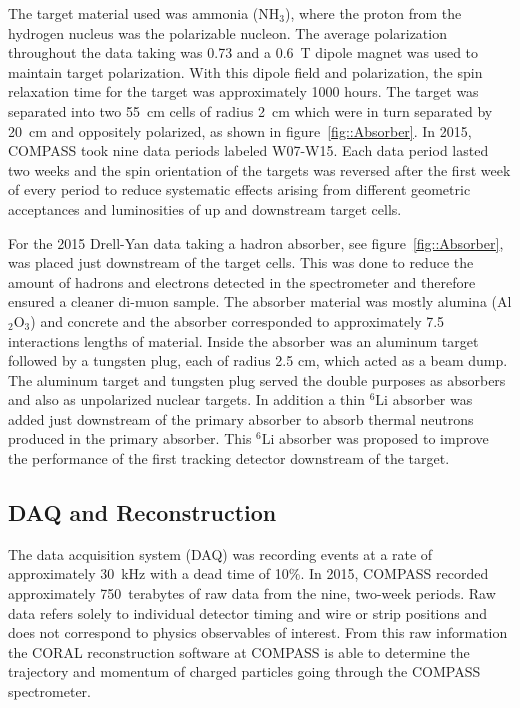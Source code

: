 The target material used was ammonia ($\mathrm{NH}_3$), where the proton from
the hydrogen nucleus was the polarizable nucleon.  The average polarization
throughout the data taking was 0.73 and a 0.6~T dipole magnet was used to
maintain target polarization.  With this dipole field and polarization, the spin
relaxation time for the target was approximately 1000 hours.  The target was
separated into two 55~cm cells of radius 2~cm which were in turn separated by
20~cm and oppositely polarized, as shown in figure~\ref{fig::Absorber}.  In 2015,
COMPASS took nine data periods labeled W07-W15.  Each data period lasted two
weeks and the spin orientation of the targets was reversed after the first week
of every period to reduce systematic effects arising from different geometric
acceptances and luminosities of up and downstream target cells.


For the 2015 Drell-Yan data taking a hadron absorber,
see figure~\ref{fig::Absorber}, was placed just downstream of the target
cells.  This was done to reduce the amount of hadrons and electrons
detected in the spectrometer and therefore ensured a cleaner di-muon
sample.  The absorber material was mostly alumina (Al$_2$O$_3$) and
concrete and the absorber corresponded to approximately 7.5
interactions lengths of material.  Inside the absorber was an aluminum
target followed by a tungsten plug, each of radius 2.5 cm, which acted
as a beam dump.  The aluminum target and tungsten plug served the
double purposes as absorbers and also as unpolarized nuclear targets.
In addition a thin $^6\mathrm{Li}$ absorber was added just downstream of the
primary absorber to absorb thermal neutrons produced in the primary
absorber.  This $^6\mathrm{Li}$ absorber was proposed to improve the
performance of the first tracking detector downstream of the
target. \par

\subsection{DAQ and Reconstruction}
The data acquisition system (DAQ) was recording events at a rate of
approximately 30~kHz with a dead time of 10\%.  In 2015, COMPASS
recorded approximately 750~terabytes of raw data from the nine,
two-week periods.  Raw data refers solely to individual detector
timing and wire or strip positions and does not correspond to physics
observables of interest.  From this raw information the CORAL
reconstruction software at COMPASS is able to determine the trajectory
and momentum of charged particles going through the COMPASS
spectrometer.

